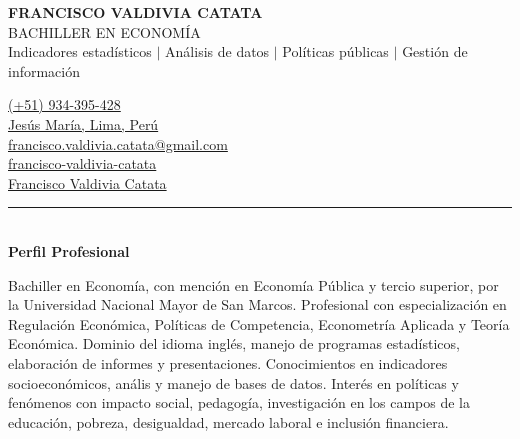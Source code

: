 \documentclass{resume}
\begin{document}
\noindent
\begin{minipage}{0.683\linewidth}
	\MakeUppercase{\LARGE \bf Francisco Valdivia Catata} \\
	\MakeUppercase{Bachiller en Economía} \\
	{\small Indicadores estadísticos $|$ Análisis de datos $|$ Políticas públicas $|$ Gestión de información}
\end{minipage}
\noindent
\begin{minipage}{0.317\textwidth}
	{\color{vino}\faPhone} {\href{tel:934395428}{(+51) 934-395-428}} \\
	{\color{vino}\faMapMarker} {\href{https://www.google.com/maps/place/Jesús+María/@-12.0786039,-77.0600128,15z/data=!3m1!4b1!4m6!3m5!1s0x9105c8e3646ab8d7:0x848660d2fc40ce50!8m2!3d-12.0824947!4d-77.0506092!16zL20vMDd0Z2c4?entry=ttu}{Jesús María, Lima, Perú}} \\
	{\color{vino}\faEnvelopeSquare} {\href{mailto:francisco.valdivia.catata@gmail.com}{francisco.valdivia.catata@gmail.com}} \\
	{\color{vino}\faLinkedinSquare} {\href{https://www.linkedin.com/in/francisco-valdivia-catata/}{francisco-valdivia-catata}}	\\
	{\color{vino}\faGithub} {\href{https://github.com/SrFerald}{Francisco Valdivia Catata}}
\end{minipage}
\vspace{-3pt}


{\color{vino} \noindent \rule{\textwidth}{1pt}} \\
{\color{vino} \noindent \faUser \; {\large \bf Perfil Profesional}}
\vspace{3pt}

\noindent Bachiller en Economía, con mención en Economía Pública y tercio superior, por la Universidad Nacional Mayor de San Marcos.
Profesional con especialización en Regulación Económica, Políticas de Competencia, Econometría Aplicada y Teoría Económica.
Dominio del idioma inglés, manejo de programas estadísticos, elaboración de informes y presentaciones.
Conocimientos en indicadores socioeconómicos, anális y manejo de bases de datos.
Interés en políticas y fenómenos con impacto social, pedagogía, investigación en los campos de la educación, pobreza, desigualdad, mercado laboral e inclusión financiera.
\vspace{3pt}

\end{document}
